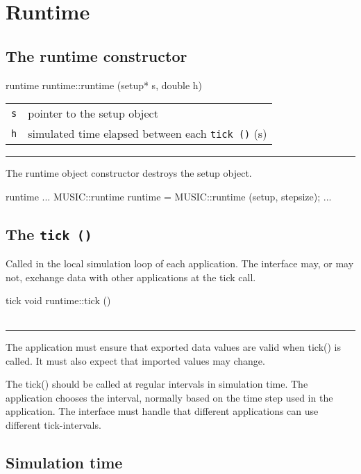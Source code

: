 \documentclass[a4paper]{report}
\makeatletter
\newenvironment{parameters}%
{\begin{tabular}{@{\hspace{2em}}lp{0.6\textwidth}}}%
{\end{tabular}\par\vspace{1mm}\par\hrule\par\vspace{5mm}}
\makeatother
\begin{document}
\section{Runtime}

\subsection{The runtime constructor}

\begin{head}{runtime}
  runtime::runtime (setup* s, double h)
\end{head}
\begin{parameters}
  \lstinline|s| & pointer to the setup object \\
  \lstinline|h| & simulated time elapsed between each \lstinline|tick ()| (s) \\
\end{parameters}

The runtime object constructor destroys the setup object.

\begin{code}{runtime}
  ...
  MUSIC::runtime runtime = MUSIC::runtime (setup, stepsize);
  ...
\end{code}

\subsection{The \lstinline|tick ()|}

Called in the local simulation loop of each application.  The
interface may, or may not, exchange data with other applications at
the tick call.

\begin{head}{tick}
  void runtime::tick ()
\end{head}
\begin{parameters}
\end{parameters}

The application must ensure that exported data values are valid when
tick() is called.  It must also expect that imported values may change.

The tick() should be called at regular intervals in simulation time.
The application chooses the interval, normally based on the time step
used in the application.  The interface must handle that different
applications can use different tick-intervals.

\pagebreak
\subsection{Simulation time}
\end{document}
